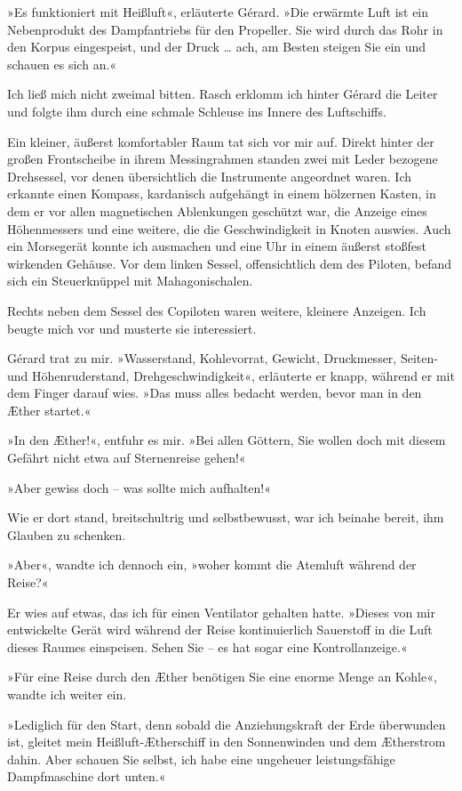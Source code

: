 »Es funktioniert mit Heißluft«, erläuterte Gérard. »Die erwärmte
Luft ist ein Nebenprodukt des Dampfantriebs für den Propeller. Sie
wird durch das Rohr in den Korpus eingespeist, und der Druck \ldots{}
ach, am Besten steigen Sie ein und schauen es sich an.«

Ich ließ mich nicht zweimal bitten. Rasch erklomm ich hinter Gérard
die Leiter und folgte ihm durch eine schmale Schleuse ins Innere
des Luftschiffs.

Ein kleiner, äußerst komfortabler Raum tat sich vor mir auf. Direkt
hinter der großen Frontscheibe in ihrem Messingrahmen standen zwei
mit Leder bezogene Drehsessel, vor denen übersichtlich die
Instrumente angeordnet waren. Ich erkannte einen Kompass,
kardanisch aufgehängt in einem hölzernen Kasten, in dem er vor
allen magnetischen Ablenkungen geschützt war, die Anzeige eines
Höhenmessers und eine weitere, die die Geschwindigkeit in Knoten
auswies. Auch ein Morsegerät konnte ich ausmachen und eine Uhr in
einem äußerst stoßfest wirkenden Gehäuse. Vor dem linken Sessel,
offensichtlich dem des Piloten, befand sich ein Steuerknüppel mit
Mahagonischalen.

Rechts neben dem Sessel des Copiloten waren weitere, kleinere
Anzeigen. Ich beugte mich vor und musterte sie interessiert.

Gérard trat zu mir. »Wasserstand, Kohlevorrat, Gewicht,
Druckmesser, Seiten- und Höhenruderstand, Drehgeschwindigkeit«,
erläuterte er knapp, während er mit dem Finger darauf wies. »Das
muss alles bedacht werden, bevor man in den Æther startet.«

»In den Æther!«, entfuhr es mir. »Bei allen Göttern, Sie wollen
doch mit diesem Gefährt nicht etwa auf Sternenreise gehen!«

»Aber gewiss doch – was sollte mich aufhalten!«

Wie er dort stand, breitschultrig und selbstbewusst, war ich
beinahe bereit, ihm Glauben zu schenken.

»Aber«, wandte ich dennoch ein, »woher kommt die Atemluft während
der Reise?«

Er wies auf etwas, das ich für einen Ventilator gehalten hatte.
»Dieses von mir entwickelte Gerät wird während der Reise
kontinuierlich Sauerstoff in die Luft dieses Raumes einspeisen.
Sehen Sie – es hat sogar eine Kontrollanzeige.«

»Für eine Reise durch den Æther benötigen Sie eine enorme Menge an
Kohle«, wandte ich weiter ein.

»Lediglich für den Start, denn sobald die Anziehungskraft der Erde
überwunden ist, gleitet mein Heißluft-Ætherschiff in den
Sonnenwinden und dem Ætherstrom dahin. Aber schauen Sie selbst, ich
habe eine ungeheuer leistungsfähige Dampfmaschine dort unten.«

